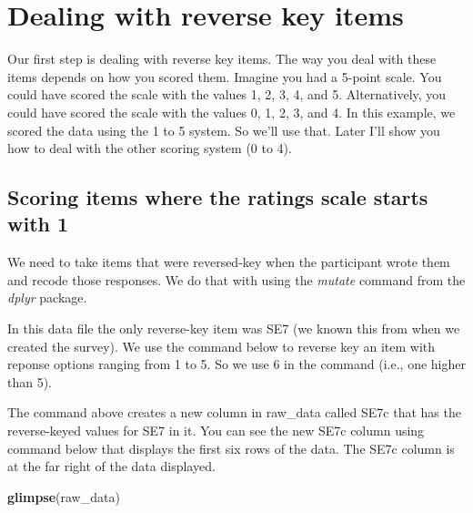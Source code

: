 \documentclass[
]{krantz}
\makeatletter
\newenvironment{Shaded}{\begin{snugshade}}{\end{snugshade}}
\newcommand{\DataTypeTok}[1]{\textcolor[rgb]{0.27,0.27,0.27}{#1}}
\newcommand{\DecValTok}[1]{\textcolor[rgb]{0.06,0.06,0.06}{#1}}
\newcommand{\KeywordTok}[1]{\textcolor[rgb]{0.27,0.27,0.27}{\textbf{#1}}}
\newcommand{\NormalTok}[1]{#1}
\newcommand{\OperatorTok}[1]{\textcolor[rgb]{0.43,0.43,0.43}{\textbf{#1}}}
\newcommand{\StringTok}[1]{\textcolor[rgb]{0.5,0.5,0.5}{#1}}
\newenvironment{kframe}{%
\medskip{}
\setlength{\fboxsep}{.8em}
 \def\at@end@of@kframe{}%
 \ifinner\ifhmode%
  \def\at@end@of@kframe{\end{minipage}}%
  \begin{minipage}{\columnwidth}%
 \fi\fi%
 \def\FrameCommand##1{\hskip\@totalleftmargin \hskip-\fboxsep
 \colorbox{shadecolor}{##1}\hskip-\fboxsep
     \hskip-\linewidth \hskip-\@totalleftmargin \hskip\columnwidth}%
 \MakeFramed {\advance\hsize-\width
   \@totalleftmargin\z@ \linewidth\hsize
   \@setminipage}}%
 {\par\unskip\endMakeFramed%
 \at@end@of@kframe}
\renewenvironment{Shaded}{\begin{kframe}}{\end{kframe}}
\makeatother
\begin{document}
\hypertarget{dealing-with-reverse-key-items}{%
\section{Dealing with reverse key items}\label{dealing-with-reverse-key-items}}

Our first step is dealing with reverse key items. The way you deal with these items depends on how you scored them. Imagine you had a 5-point scale. You could have scored the scale with the values 1, 2, 3, 4, and 5. Alternatively, you could have scored the scale with the values 0, 1, 2, 3, and 4. In this example, we scored the data using the 1 to 5 system. So we'll use that. Later I'll show you how to deal with the other scoring system (0 to 4).

\hypertarget{scoring-items-where-the-ratings-scale-starts-with-1}{%
\subsection{Scoring items where the ratings scale starts with 1}\label{scoring-items-where-the-ratings-scale-starts-with-1}}

We need to take items that were reversed-key when the participant wrote them and recode those responses. We do that with using the \emph{mutate} command from the \emph{dplyr} package.

In this data file the only reverse-key item was SE7 (we known this from when we created the survey). We use the command below to reverse key an item with reponse options ranging from 1 to 5. So we use 6 in the command (i.e., one higher than 5).

\begin{Shaded}
\end{Shaded}

The command above creates a new column in raw\_data called SE7c that has the reverse-keyed values for SE7 in it. You can see the new SE7c column using command below that displays the first six rows of the data. The SE7c column is at the far right of the data displayed.

\begin{Shaded}
\begin{Highlighting}[]
\KeywordTok{glimpse}\NormalTok{(raw_data)}
\end{Highlighting}
\end{Shaded}
\end{document}
